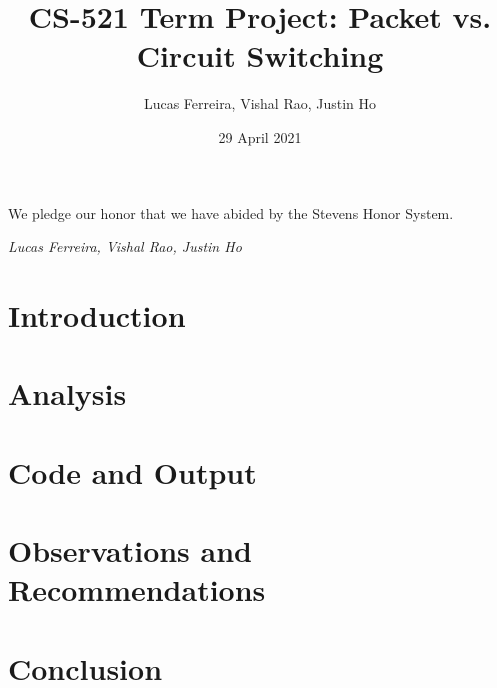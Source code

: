 \documentclass{article}
\title{CS-521 Term Project: Packet vs. Circuit Switching}
\author{Lucas Ferreira, Vishal Rao, Justin Ho}
\date{29 April 2021}
\begin{document}
  \maketitle

  {\flushleft We pledge our honor that we have abided by the Stevens Honor System.

  \textit{Lucas Ferreira, Vishal Rao, Justin Ho}}

  \section{Introduction}



  \section{Analysis}



  \section{Code and Output}



  \section{Observations and Recommendations}



  \section{Conclusion}
\end{document}
